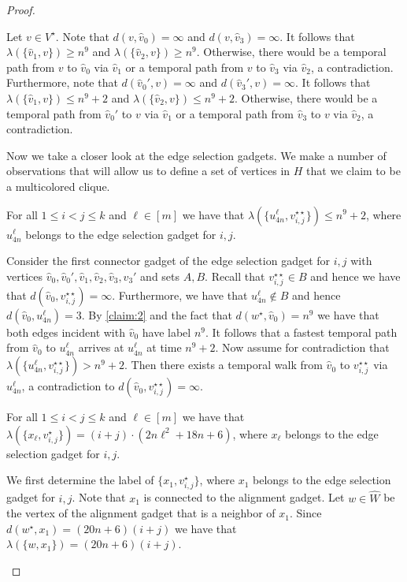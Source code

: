\documentclass[a4paper,UKenglish,cleveref, autoref, thm-restate]{lipics-v2021}
\begin{document}
\begin{proof}
\begin{claimproof}
%    
Let $v\in V^\star$. Note that $d(v,\hat{v}_0)=\infty$ and $d(v,\hat{v}_3)=\infty$. It follows that $\lambda(\{\hat{v}_1,v\})\ge n^9$ and $\lambda(\{\hat{v}_2,v\})\ge n^9$. Otherwise, there would be a temporal path from $v$ to $\hat{v}_0$ via $\hat{v}_1$ or a temporal path from $v$ to $\hat{v}_3$ via $\hat{v}_2$, a contradiction.
Furthermore, note that $d(\hat{v}_0',v)=\infty$ and $d(\hat{v}_3',v)=\infty$. It follows that $\lambda(\{\hat{v}_1,v\})\le n^9+2$ and $\lambda(\{\hat{v}_2,v\})\le n^9+2$. Otherwise, there would be a temporal path from $\hat{v}_0'$ to $v$ via $\hat{v}_1$ or a temporal path from $\hat{v}_3$ to $v$ via $\hat{v}_2$, a contradiction.
\end{claimproof}

Now we take a closer look at the edge selection gadgets. We make a number of observations that will allow us to define a set of vertices in $H$ that we claim to be a multicolored clique.

\begin{claim}\label{claim:3}
    For all $1\le i<j\le k$ and $\ell\in[m]$ we have that $\lambda(\{u^\ell_{4n},v_{i,j}^{\star\star}\})\le n^9+2$, where $u^\ell_{4n}$ belongs to the edge selection gadget for $i,j$.
\end{claim}
\begin{claimproof}
    Consider the first connector gadget of the edge selection gadget for $i,j$ with vertices $\hat{v}_0,\hat{v}_0',\hat{v}_1,\hat{v}_2,\hat{v}_3,\hat{v}_3'$ and sets $A,B$. Recall that $v_{i,j}^{\star\star}\in B$ and hence we have that $d(\hat{v}_0,v_{i,j}^{\star\star})=\infty$. Furthermore, we have that $u^\ell_{4n}\notin B$ and hence $d(\hat{v}_0,u^\ell_{4n})=3$. By \cref{claim:2} and the fact that $d(w^\star,\hat{v}_0)=n^9$ we have that both edges incident with $\hat{v}_0$ have label $n^9$. It follows that a fastest temporal path from $\hat{v}_0$ to $u^\ell_{4n}$ arrives at $u^\ell_{4n}$ at time $n^9+2$. Now assume for contradiction that $\lambda(\{u^\ell_{4n},v_{i,j}^{\star\star}\})> n^9+2$. Then there exists a temporal walk from $\hat{v}_0$ to $v_{i,j}^{\star\star}$ via $u^\ell_{4n}$, a contradiction to $d(\hat{v}_0,v_{i,j}^{\star\star})=\infty$.
\end{claimproof}

\begin{claim}\label{claim:4}
    For all $1\le i<j\le k$ and $\ell\in[m]$ we have that $\lambda(\{x_\ell,v_{i,j}^{\star}\})=(i+j)\cdot (2n\ell^2 +18n+6)$, where $x_\ell$ belongs to the edge selection gadget for $i,j$.
\end{claim}
\begin{claimproof}
    We first determine the label of $\{x_1,v_{i,j}^{\star}\}$, where $x_1$ belongs to the edge selection gadget for $i,j$. Note that $x_1$ is connected to the alignment gadget. Let $w\in \hat{W}$ be the vertex of the alignment gadget that is a neighbor of $x_1$. Since $d(w^\star,x_1)=(20n+6)(i+j)$ we have that $\lambda(\{w,x_1\})=(20n+6)(i+j)$. 


\end{claimproof}
\end{proof}
\end{document}

